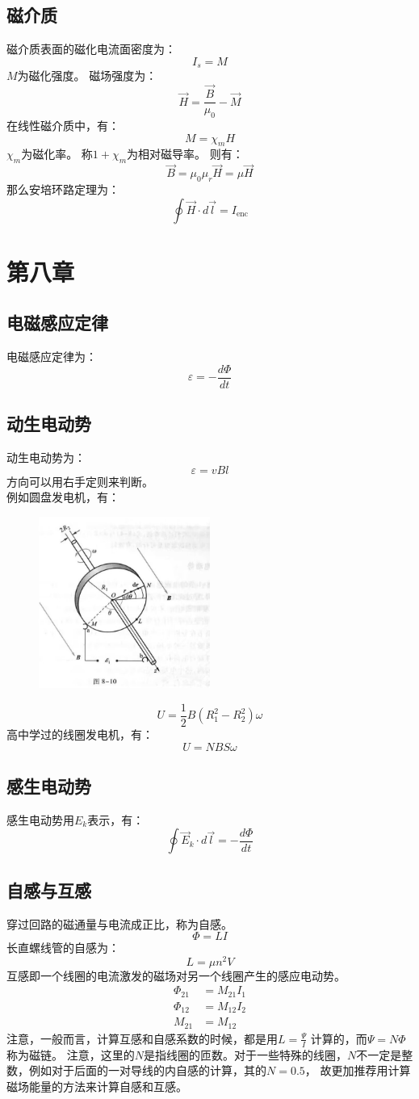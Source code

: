 \documentclass{ctexart}
\begin{document}
\subsection{磁介质}
磁介质表面的磁化电流面密度为：
$$
    I_s = M
$$
$M$为磁化强度。
磁场强度为：
$$
    \vec{H} = \frac{\vec{B}}{\mu_0} - \vec{M}
$$
在线性磁介质中，有：
$$
    M = \chi_m H
$$
$\chi_m$为磁化率。
称$1+\chi_m$为相对磁导率。
则有：
$$
    \vec{B} = \mu_0\mu_r \vec{H} = \mu \vec{H}
$$
那么安培环路定理为：
$$
    \oint \vec{H} \cdot d\vec{l} = I_{\text{enc}}
$$
\section{第八章}
\subsection{电磁感应定律}
电磁感应定律为：
$$
    \varepsilon = -\frac{d\Phi}{dt}
$$
\subsection{动生电动势}
动生电动势为：
$$
    \varepsilon = vBl
$$
方向可以用右手定则来判断。\\
例如圆盘发电机，有：
\begin{figure}[H]
    \centering
    \includegraphics[width=0.5\textwidth]{img/8-10.jpg}
\end{figure}
$$
    U = \frac{1}{2} B (R_1^2 - R_2^2) \omega
$$
高中学过的线圈发电机，有：
$$
    U = NBS\omega
$$
\subsection{感生电动势}
感生电动势用$E_k$表示，有：
$$
    \oint \vec{E}_k \cdot d\vec{l} = -\frac{d\Phi}{dt}
$$
\subsection{自感与互感}
穿过回路的磁通量与电流成正比，称为自感。
$$
    \varPhi = LI
$$
长直螺线管的自感为：
$$
    L = \mu n^2 V
$$
互感即一个线圈的电流激发的磁场对另一个线圈产生的感应电动势。
\begin{align*}
    \varPhi_{21} &= M_{21}I_1 \\
    \varPhi_{12} &= M_{12}I_2 \\
    M_{21} &= M_{12}
\end{align*}
注意，一般而言，计算互感和自感系数的时候，都是用$L = \frac{\varPsi}{I}$ 计算的，而$\varPsi = N \Phi$ 称为磁链。
注意，这里的$N$是指线圈的匝数。对于一些特殊的线圈，$N$不一定是整数，例如对于后面的一对导线的内自感的计算，其的$N=0.5$，
故更加推荐用计算磁场能量的方法来计算自感和互感。
\end{document}
